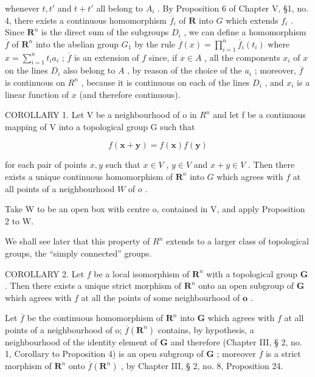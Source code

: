 whenever \(t, t'\) and \(t + t'\) all belong to \(A_i\) . By Proposition 6 of Chapter V, §1, no. 4, there exists a continuous homomorphism \(\overline{f}_i\) of \(\mathbf{R}\) into \(G\) which extends \(f_i\) . Since \(\mathbf{R}^n\) is the direct sum of the subgroups \(D_i\) , we can define a homomorphism \(\overline{f}\) of \(\mathbf{R}^n\) into the abelian group \(G_1\) by the rule \(\overline{f}(x) = \prod_{i=1}^{n} \overline{f}_i(t_i)\) where \(x = \sum_{i=1}^{n} t_i a_i\) ; \(\overline{f}\) is an extension of \(f\) since, if \(x \in A\) , all the components \(x_i\) of \(x\) on the lines \(D_i\) also belong to \(A\) , by reason of the choice of the \(a_i\) ; moreover, \(\overline{f}\) is continuous on \(R^n\) , because it is continuous on each of the lines \(D_i\) , and \(x_i\) is a linear function of \(x\) (and therefore continuous).

COROLLARY 1. Let V be a neighbourhood of o in \(R^{n}\) and let f be a continuous mapping of V into a topological group G such that

\[
f (\boldsymbol {x} + \boldsymbol {y}) = f (\boldsymbol {x}) f (\boldsymbol {y})
\]

for each pair of points \(x, y\) such that \(x \in V\) , \(y \in V\) and \(x + y \in V\) . Then there exists a unique continuous homomorphism of \(\mathbf{R}^n\) into \(G\) which agrees with \(f\) at all points of a neighbourhood \(W\) of \(o\) .

Take W to be an open box with centre o, contained in V, and apply Proposition 2 to W.

We shall see later that this property of \(R^{n}\) extends to a larger class of topological groups, the ``simply connected'' groups.

COROLLARY 2. Let \(f\) be a local isomorphism of \(\mathbf{R}^n\) with a topological group \(\mathbf{G}\) . Then there exists a unique strict morphism of \(\mathbf{R}^n\) onto an open subgroup of \(\mathbf{G}\) which agrees with \(f\) at all the points of some neighbourhood of \(\mathbf{o}\) .

Let \(\overline{f}\) be the continuous homomorphism of \(\mathbf{R}^n\) into \(\mathbf{G}\) which agrees with \(f\) at all points of a neighbourhood of o; \(\overline{f}(\mathbf{R}^n)\) contains, by hypothesis, a neighbourhood of the identity element of \(\mathbf{G}\) and therefore (Chapter III, § 2, no. 1, Corollary to Proposition 4) is an open subgroup of \(\mathbf{G}\) ; moreover \(\overline{f}\) is a strict morphism of \(\mathbf{R}^n\) onto \(\overline{f}(\mathbf{R}^n)\) , by Chapter III, § 2, no. 8, Proposition 24.

